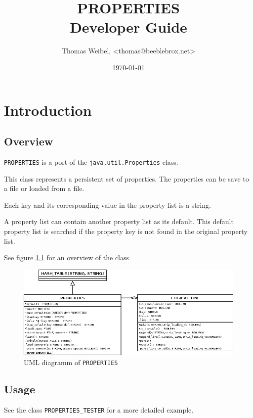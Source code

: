 \documentclass[a4paper,fleqn]{report}
\title{PROPERTIES \\ Developer Guide}
\author{Thomas Weibel, <thomas@beeblebrox.net>}
\date{\today}
\begin{document}
\maketitle

\tableofcontents

\chapter{Introduction}
\label{cha:introduction}


\section{Overview}
\label{sec:overview}

\texttt{PROPERTIES} is a port of the \texttt{java.util.Properties} class.

This class represents a persistent set of properties. The properties
can be save to a file or loaded from a file.

Each key and its corresponding value in the property list is a string.

A property list can contain another property list as its default. This
default property list is searched if the property key is not found in
the original property list.

See figure \ref{fig:uml-diagram} for an overview of the class

\begin{figure}[htbp]
  \centering
  \includegraphics[width=\textwidth]{./uml}
  \caption{UML diagramm of \texttt{PROPERTIES}}
  \label{fig:uml-diagram}
\end{figure}


\section{Usage}
\label{sec:usage}

See the class \texttt{PROPERTIES\_TESTER} for a more detailed example.
\end{document}
